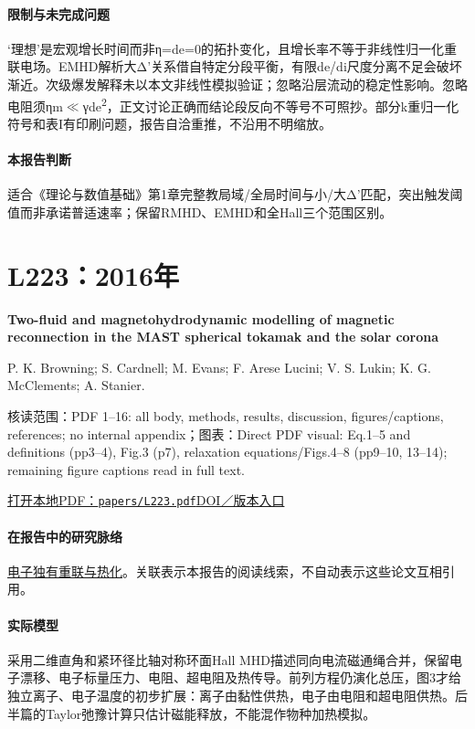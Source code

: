 \documentclass[UTF8,a4paper,11pt,openany,fontset=fandol]{ctexbook}
\begin{document}
\paragraph{限制与未完成问题}‘理想’是宏观增长时间而非η=de=0的拓扑变化，且增长率不等于非线性归一化重联电场。EMHD解析大Δ'关系借自特定分段平衡，有限de/di尺度分离不足会破坏渐近。次级爆发解释未以本文非线性模拟验证；忽略沿层流动的稳定性影响。忽略电阻须ηm\ensuremath{\ll}γde\textsuperscript{2}，正文讨论正确而结论段反向不等号不可照抄。部分k重归一化符号和表I有印刷问题，报告自洽重推，不沿用不明缩放。

\paragraph{本报告判断}适合《理论与数值基础》第1章完整教局域/全局时间与小/大Δ'匹配，突出触发阈值而非承诺普适速率；保留RMHD、EMHD和全Hall三个范围区别。

\section{L223：2016年}\label{paper:L223}

\textbf{Two-fluid and magnetohydrodynamic modelling of magnetic reconnection in the MAST spherical tokamak and the solar corona}\citep{L223}\

P. K. Browning;  S. Cardnell;  M. Evans;  F. Arese Lucini;  V. S. Lukin;  K. G. McClements;  A. Stanier.

\textsf{核读范围：}PDF 1–16: all body,  methods,  results,  discussion,  figures/captions,  references;  no internal appendix；\textsf{图表：}Direct PDF visual: Eq.1–5 and definitions (pp3–4),  Fig.3 (p7),  relaxation equations/Figs.4–8 (pp9–10, 13–14);  remaining figure captions read in full text.

\href{run:../papers/L223.pdf}{打开本地PDF：\texttt{papers/L223.pdf}}\quad\href{https://doi.org/10.1088/0741-3335/58/1/014041}{DOI／版本入口}

\paragraph{在报告中的研究脉络}\hyperref[story:energy]{电子独有重联与热化}。关联表示本报告的阅读线索，不自动表示这些论文互相引用。

\paragraph{实际模型}采用二维直角和紧环径比轴对称环面Hall MHD描述同向电流磁通绳合并，保留电子漂移、电子标量压力、电阻、超电阻及热传导。前列方程仍演化总压，图3才给独立离子、电子温度的初步扩展：离子由黏性供热，电子由电阻和超电阻供热。后半篇的Taylor弛豫计算只估计磁能释放，不能混作物种加热模拟。
\end{document}
